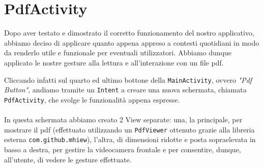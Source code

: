 \section{PdfActivity}
Dopo aver testato e dimostrato il corretto funzionamento del nostro applicativo, abbiamo deciso di applicare 
    quanto appena appreso a contesti quotidiani in modo da renderlo utile e funzionale per eventuali 
    utilizzatori. Abbiamo dunque applicato le nostre gesture alla lettura e all'interazione con un file pdf.
\begin{multicols}{2}
    \noindent Cliccando infatti sul quarto ed ultimo bottone della \texttt{MainActivity}, ovvero \textit{"Pdf Button"}, andiamo 
    tramite un \texttt{Intent} a creare una nuova schermata, chiamata \texttt{PdfActivity}, che svolge le funzionalità 
    appena espresse.\\
    \\
    \noindent In questa schermata abbiamo creato 2 View separate: una, la principale, per 
    mostrare il pdf (effettuato utilizzando un \texttt{PdfViewer} ottenuto grazie alla libreria esterna 
    \texttt{com.github.mhiew}), l'altra, di dimensioni ridotte e posta sopraelevata in basso a destra, per 
    gestire la videocamera frontale e per consentire, dunque, all'utente, di vedere le gesture 
    effettuate.
        \columnbreak
        \begin{multicolfigure}
            \centering

\end{multicolfigure}
\end{multicols}

